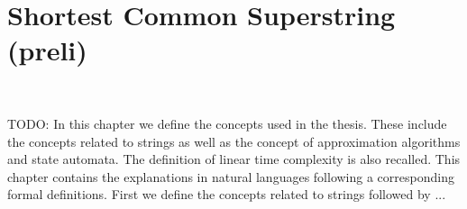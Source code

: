 \documentclass[english,twoside,censored,csm,algorithms-track-2020]{HYthesisML}
\theoremstyle{plain}
\theoremstyle{definition}
\begin{document}






\chapter {Shortest Common Superstring (preli)}~\label{chp-preli}








TODO:
In this chapter we define the concepts used in the thesis. These include the concepts related to
strings as well as the concept of approximation algorithms and state automata. The definition of
linear time complexity is also recalled. This chapter contains the explanations in natural
languages following a corresponding formal definitions. First we define the concepts related
to strings followed by ...  \\[1in]
\end{document}
